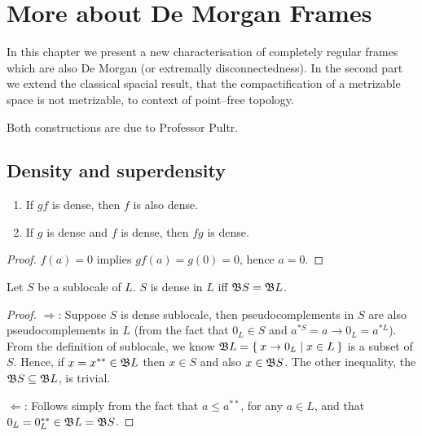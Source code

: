 \chapter{More about De Morgan Frames}

In this chapter we present a new characterisation of completely regular frames which are also De Morgan (or extremally disconnectedness).
In the second part we extend the classical spacial result, that the compactification of a metrizable space is not metrizable, to context of point--free topology.

Both constructions are due to Professor Pultr.

\section{Density and superdensity}

\begin{lemma}\label{p:denseProperties}
    \begin{enumerate}
        \item If $gf$ is dense, then $f$ is also dense.
        \item If $g$ is dense and $f$ is dense, then $fg$ is dense.
    \end{enumerate}
\end{lemma}
\begin{proof}
    $f(a) = 0$ implies $gf(a) = g(0) = 0$, hence $a = 0$.
\end{proof}

\begin{lemma}\label{p:denseProperties2}
    Let $S$ be a sublocale of $L$. $S$ is dense in $L$ iff $\mathfrak{B} S = \mathfrak{B} L$.
\end{lemma}
\begin{proof}
    $\Rightarrow$: Suppose $S$ is dense sublocale, then pseudocomplements in $S$ are also pseudocomplements in $L$ (from the fact that $0_L\in S$ and $a^{*S} = a\to 0_L = a^{*L}$).
    From the definition of sublocale, we know $\mathfrak{B} L = \Set{ x\to 0_L | x\in L}$ is a subset of $S$. Hence, if $x = x^{**}\in \mathfrak{B} L$ then $x \in S$ and also $x \in \mathfrak{B} S$. The other inequality, the $\mathfrak{B} S\subseteq \mathfrak{B} L$, is trivial.

    $\Leftarrow$: Follows simply from the fact that $a\leq a^{**}$, for any $a\in L$, and that $0_L = 0_L^{**} \in \mathfrak{B} L = \mathfrak{B} S$.
\end{proof}

